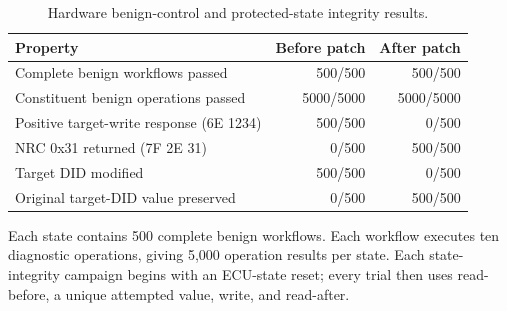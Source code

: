 \begin{table}[t]
\centering
\small
\caption{Hardware benign-control and protected-state integrity results.}
\label{tab:benign-state-integrity}
\begin{tabular}{lrr}
\toprule
Property & Before patch & After patch \\
\midrule
Complete benign workflows passed & 500/500 & 500/500 \\
Constituent benign operations passed & 5000/5000 & 5000/5000 \\
Positive target-write response (6E 1234) & 500/500 & 0/500 \\
NRC 0x31 returned (7F 2E 31) & 0/500 & 500/500 \\
Target DID modified & 500/500 & 0/500 \\
Original target-DID value preserved & 0/500 & 500/500 \\
\bottomrule
\end{tabular}
\begin{minipage}{0.98\linewidth}\footnotesize
Each state contains 500 complete benign workflows. Each workflow executes ten diagnostic operations, giving 5,000 operation results per state. Each state-integrity campaign begins with an ECU-state reset; every trial then uses read-before, a unique attempted value, write, and read-after.
\end{minipage}
\end{table}
